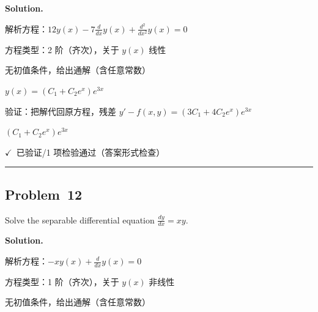\documentclass[12pt, a4paper]{article}
\newcommand{\problem}[1]{\subsection*{Problem~#1}}
\newcommand{\solution}{%
  \par\noindent
  {\color{solutiongreen}\bfseries Solution.}\par
}
\newcommand{\verifyok}{\textcolor{solutiongreen}{\ensuremath{\checkmark}\ 已验证}}
\begin{document}
\solution

\begin{stepbox}
解析方程：$12 y{\left(x \right)} - 7 \frac{d}{d x} y{\left(x \right)} + \frac{d^{2}}{d x^{2}} y{\left(x \right)} = 0$
\end{stepbox}

\begin{stepbox}
方程类型：2 阶（齐次），关于 $y(x)$ 线性
\end{stepbox}

\begin{stepbox}
无初值条件，给出通解（含任意常数）
\end{stepbox}

\begin{stepbox}
$y(x) = \left(C_{1} + C_{2} e^{x}\right) e^{3 x}$
\end{stepbox}

\begin{stepbox}
验证：把解代回原方程，残差 $y' - f(x,y) = \left(3 C_{1} + 4 C_{2} e^{x}\right) e^{3 x}$
\end{stepbox}

\begin{center}
$\boxed{\left(C_{1} + C_{2} e^{x}\right) e^{3 x}}$
\end{center}

\begin{verifybox}\small \verifyok{}/1 项检验通过（答案形式检查） \end{verifybox}

\vspace{0.8em}\hrule\vspace{0.8em}

\problem{12}

\begin{stepbox}
Solve the separable differential equation $\frac{dy}{dx} = x y$.
\end{stepbox}

\solution

\begin{stepbox}
解析方程：$- x y{\left(x \right)} + \frac{d}{d x} y{\left(x \right)} = 0$
\end{stepbox}

\begin{stepbox}
方程类型：1 阶（齐次），关于 $y(x)$ 非线性
\end{stepbox}

\begin{stepbox}
无初值条件，给出通解（含任意常数）
\end{stepbox}
\end{document}
